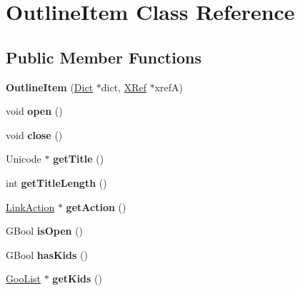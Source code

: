 \hypertarget{class_outline_item}{}\section{Outline\+Item Class Reference}
\label{class_outline_item}
\subsection*{Public Member Functions}
\begin{DoxyCompactItemize}
\item 
\mbox{\label{class_outline_item_a894de7c6c6ae38e0295a3171e7c98302}} 
{\bfseries Outline\+Item} (\hyperlink{class_dict}{Dict} $\ast$dict, \hyperlink{class_x_ref}{X\+Ref} $\ast$xrefA)
\item 
\mbox{\label{class_outline_item_ab4077e008f307145dac3400f5a77ffa7}} 
void {\bfseries open} ()
\item 
\mbox{\label{class_outline_item_ac2b8f82180da4b9c794246414f46cd27}} 
void {\bfseries close} ()
\item 
\mbox{\label{class_outline_item_af75e69178eee9612983015511355f48c}} 
Unicode $\ast$ {\bfseries get\+Title} ()
\item 
\mbox{\label{class_outline_item_ab84ae375e8b8f167d2b4a05878e96aa6}} 
int {\bfseries get\+Title\+Length} ()
\item 
\mbox{\label{class_outline_item_af2430303fe42564cc16f276dcfa33610}} 
\hyperlink{class_link_action}{Link\+Action} $\ast$ {\bfseries get\+Action} ()
\item 
\mbox{\label{class_outline_item_a3e9ea2b2d68fd9a8c6a8dea1474c2677}} 
G\+Bool {\bfseries is\+Open} ()
\item 
\mbox{\label{class_outline_item_a8689a62b3d5b91f642313bfd1efa484b}} 
G\+Bool {\bfseries has\+Kids} ()
\item 
\mbox{\label{class_outline_item_a4081fb1d6c76fdd9376b6dbd32887318}} 
\hyperlink{class_goo_list}{Goo\+List} $\ast$ {\bfseries get\+Kids} ()
\end{DoxyCompactItemize}
